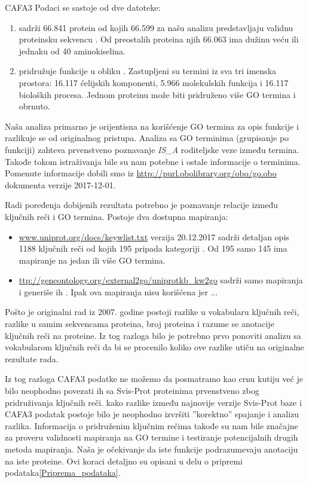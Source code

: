 CAFA3 Podaci se sastoje od dve datoteke:
\begin{enumerate}
  \item {}  sadrži 66.841 protein od kojih 66.599
    za našu analizu predstavljaju validnu proteinsku sekvencu . Od preostalih
    proteina njih 66.063 ima dužinu veću ili jednaku od 40 aminokiselina.
  \item {} pridružuje funkcije u obliku 
    . Zastupljeni su termini iz sva tri imenska prostora:
    16.117 ćelijskih komponenti, 5.966 molekulskih funkcija i 16.117 bioloških
    procesa. Jednom proteinu može biti pridruženo više GO termina i obrnuto.
\end{enumerate}

Naša analiza primarno je orijentisna na korišćenje GO termina za opis funkcije
i razlikuje se od originalnog pristupa.  Analiza sa GO terminima (grupisanje po
funkciji) zahteva prvenstveno poznavanje \textit{IS\_A} roditeljske veze između
termina. Takođe tokom istraživanja bile su nam potebne i ostale informacije o
terminima. Pomenute informacije dobili smo iz
\url{http://purl.obolibrary.org/obo/go.obo} dokumenta verzije 2017-12-01.

Radi poređenja dobijenih rezultata potrebno je poznavanje relacije između
ključnih reči i GO termina. Postoje dva dostupna mapiranja:
\begin{itemize}
  \item \url{www.uniprot.org/docs/keywlist.txt} verzija 20.12.2017 sadrži
    detaljan opis 1188 ključnih reči od kojih 195 pripada kategoriji
    .  Od 195 samo 145 ima mapiranje na jedan ili
    više GO termina.
  \item \url{ttp://geneontology.org/external2go/uniprotkb_kw2go} sadrži samo
    mapiranja i generiše ih  \parencite{Barrell2009}.
    Ipak ova mapiranja nisu korišćena jer ... 
\end{itemize}

Pošto je originalni rad\parencite{Xie2007} iz 2007. godine postoji razlike u
vokabularu ključnih reči, razlike u samim sekvencama proteina, broj proteina i
razume se anotacije ključnih reči na proteine.  Iz tog razloga bilo je potrebno
prvo ponoviti analizu sa vokabularom ključnih reči da bi se procenilo koliko
ove razlike utiču na originalne rezultate rada\parencite{Xie2007}.

Iz tog razloga CAFA3 podatke ne možemo da posmatramo kao crnu kutiju već je
bilo neophodno povezati ih sa Svis-Prot proteinima prvenstveno zbog
pridruživanja ključnih reči.  kako razlike između najnovije verzije Svis-Prot
baze i CAFA3 podatak postoje bilo je neophodno izvršiti ''korektno'' spajanje i
analizu razlika.  Informacija o pridruženim ključnim rečima takođe su nam bile
značajne za proveru validnosti mapiranja na GO termine i testiranje
potencijalnih drugih metoda mapiranja.  Naša je očekivanje da iste funkcije
podrazumevaju anotaciju na iste proteine.  Ovi koraci detaljno su opisani u
delu o pripremi podataka\ref{Priprema_podataka}.



